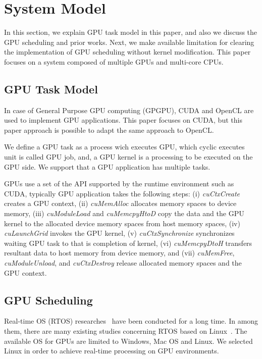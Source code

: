 \section{System Model}\label{sec:system_model}
In this section, we explain GPU task model in this paper, and also we discuss the GPU scheduling and prior works.
Next, we make available limitation for clearing the implementation of GPU scheduling without kernel modification.
This paper focuses on a system composed of multiple GPUs and multi-core CPUs.

\subsection{GPU Task Model}
In case of General Purpose GPU computing (GPGPU), CUDA and OpenCL are used to implement GPU applications.
This paper focuses on CUDA, but this paper approach is possible to adapt the same approach to OpenCL.

We define a GPU task as a process wich executes GPU,
which cyclic executes unit is called GPU job,
and, a GPU kernel is a processing to be executed on the GPU side.
We support that a GPU application has multiple tasks.

GPUs use a set of the API supported by the runtime environment such as CUDA,
typically GPU application takes the following steps:
(i) \textit{cuCtxCreate} creates a GPU context,
(ii) \textit{cuMemAlloc} allocates memory spaces to device memory, 
(iii) \textit{cuModuleLoad} and \textit{cuMemcpyHtoD} copy the data and the GPU kernel to the allocated device memory spaces from host memory spaces,
(iv) \textit{cuLaunchGrid} invokes the GPU kernel, 
(v) \textit{cuCtxSynchronize} synchronizes waiting GPU task to that is completion of kernel, 
(vi) \textit{cuMemcpyDtoH} transfers resultant data to host memory from device memory, and
(vii) \textit{cuMemFree}, \textit{cuModuleUnload}, and \textit{cuCtxDestroy} release allocated memory spaces and the GPU context.



\subsection{GPU Scheduling}
Real-time OS (RTOS) researches~\cite{spring,redline,itron,rk} have been conducted for a long time.
In among them, there are many existing studies concerning RTOS based on Linux~\cite{litmus,prk,rtai,yodaiken1999rtlinux,kato2009loadable}.
The available OS for GPUs are limited to Windows, Mac OS and Linux.
We selected Linux in order to achieve real-time processing on GPU environments.

